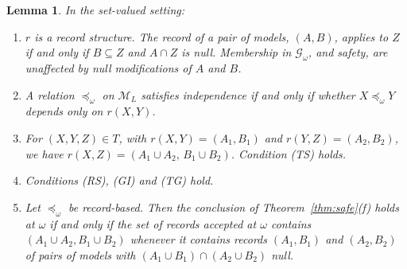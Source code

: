 \documentclass[11pt]{article}
\newtheorem{lemma}[theorem]{Lemma}
\theoremstyle{definition}
\theoremstyle{remark}
\newcommand{\M}{\mathcal M}
\newcommand{\G}{\mathcal G}
\begin{document}
\begin{lemma}\label{lem:set-records}
In the set-valued setting:
\begin{enumerate}[label=(\alph*)]
\item $r$ is a record structure. The record of a pair of models, $(A,B)$, applies to $Z$ if and only if $B\subseteq Z$ and $A\cap Z$ is null. Membership in $\G_\omega$, and safety, are unaffected by null modifications of $A$ and $B$.
\item A relation $\preceq_\omega$ on $\M_L$ satisfies independence if and only if whether $X\preceq_\omega Y$ depends only on $r(X,Y)$.
\item For $(X,Y,Z)\in T$, with $r(X,Y)=(A_1,B_1)$ and $r(Y,Z)=(A_2,B_2)$, we have $r(X,Z)=(A_1\cup A_2,\,B_1\cup B_2)$. Condition (TS) holds.
\item Conditions (RS), (GI) and (TG) hold.
\item Let $\preceq_\omega$ be record-based. Then the conclusion of Theorem~\ref{thm:safe}(f) holds at $\omega$ if and only if the set of records accepted at $\omega$ contains $(A_1\cup A_2,B_1\cup B_2)$ whenever it contains records $(A_1,B_1)$ and $(A_2,B_2)$ of pairs of models with $(A_1\cup B_1)\cap(A_2\cup B_2)$ null.
\end{enumerate}
\end{lemma}
\end{document}
